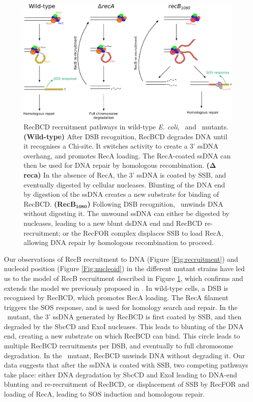 \begin{figure}[htbp]
    \centering
    \includegraphics[width=\textwidth]{Figures/Fig_mutants_pathways.pdf}
    \caption{RecBCD recruitment pathways in wild-type \emph{E. coli}, \dreca\ and \geneteneighty\ mutants. \textbf{(Wild-type)} After DSB recognition, RecBCD degrades DNA until it recognises a Chi-site. It switches activity to create a 3' ssDNA overhang, and promotes RecA loading. The RecA-coated ssDNA can then be used for DNA repair by homologous recombination. \textbf{($\mathbf{\Delta}$reca)} In the absence of RecA, the 3' ssDNA is coated by SSB, and eventually digested by cellular nucleases. Blunting of the DNA end by digestion of the ssDNA creates a new substrate for binding of RecBCD. \textbf{(RecB$\mathbf{_{1080}}$)} Following DSB recognition, \teneighty\ unwinds DNA without digesting it. The unwound ssDNA can either be digested by nucleases, leading to a new blunt dsDNA end and RecBCD re-recruitment; or the RecFOR complex displaces SSB to load RecA, allowing DNA repair by homologous recombination to proceed.}
    \label{Fig:pathways}
\end{figure}

Our observations of RecB recruitment to DNA (Figure \ref{Fig:recruitment}) and nucleoid position (Figure \ref{Fig:nucleoid}) in the different mutant strains have led us to the model of RecB recruitment described in Figure \ref{Fig:pathways}, which confirms and extends the model we previously proposed in \cite{Lepore2023}. In wild-type cells, a DSB is recognised by RecBCD, which promotes RecA loading. The RecA filament triggers the SOS response, and is used for homology search and repair. In the \dreca\ mutant, the 3' ssDNA generated by RecBCD is first coated by SSB, and then degraded by the SbcCD and ExoI nucleases\cite{Zahradka2009}. This leads to blunting of the DNA end, creating a new substrate on which RecBCD can bind. This circle leads to multiple RecBCD recruitments per DSB, and eventually to full chromosome degradation. In the \geneteneighty\ mutant, RecBCD unwinds DNA without degrading it.  Our data suggests that after the ssDNA is coated with SSB, two competing pathways take place: either DNA degradation by SbcCD and ExoI leading to DNA-end blunting and re-recruitment of RecBCD, or displacement of SSB by RecFOR and loading of RecA, leading to SOS induction and homologous repair.

